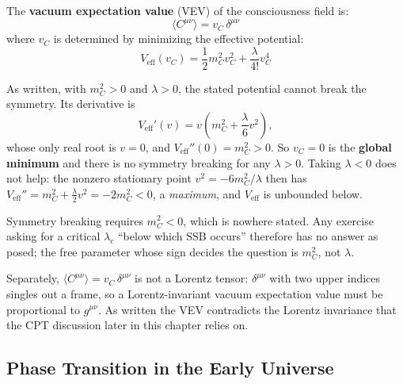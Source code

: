 \begin{definition}\label{def:consciousness-vev}
The \textbf{vacuum expectation value} (VEV) of the consciousness field is:
\begin{equation}
\langle C^{\mu\nu} \rangle = v_C \, \delta^{\mu\nu}
\end{equation}
where $v_C$ is determined by minimizing the effective potential:
\begin{equation}
V_{\text{eff}}(v_C) = \frac{1}{2}m_C^2 v_C^2 + \frac{\lambda}{4!} v_C^4
\end{equation}
\end{definition}

\begin{remark}
\label{rem:no-ssb-2026-10-03}
As written, with $m_C^2 > 0$ and $\lambda > 0$, the stated potential cannot break
the symmetry. Its derivative is
\[
V_{\text{eff}}'(v) = v\left(m_C^2 + \frac{\lambda}{6}v^2\right),
\]
whose only real root is $v = 0$, and $V_{\text{eff}}''(0) = m_C^2 > 0$. So
$v_C = 0$ is the \textbf{global minimum} and there is no symmetry breaking for any
$\lambda > 0$. Taking $\lambda < 0$ does not help: the nonzero stationary point
$v^2 = -6m_C^2/\lambda$ then has
$V_{\text{eff}}'' = m_C^2 + \tfrac{\lambda}{2}v^2 = -2m_C^2 < 0$, a
\emph{maximum}, and $V_{\text{eff}}$ is unbounded below.

Symmetry breaking requires $m_C^2 < 0$, which is nowhere stated. Any exercise
asking for a critical $\lambda_c$ ``below which SSB occurs'' therefore has no
answer as posed; the free parameter whose sign decides the question is $m_C^2$,
not $\lambda$.

Separately, $\langle C^{\mu\nu}\rangle = v_C\,\delta^{\mu\nu}$ is not a Lorentz
tensor: $\delta^{\mu\nu}$ with two upper indices singles out a frame, so a
Lorentz-invariant vacuum expectation value must be proportional to $g^{\mu\nu}$.
As written the VEV contradicts the Lorentz invariance that the CPT discussion
later in this chapter relies on.
\end{remark}

\subsection{Phase Transition in the Early Universe}


